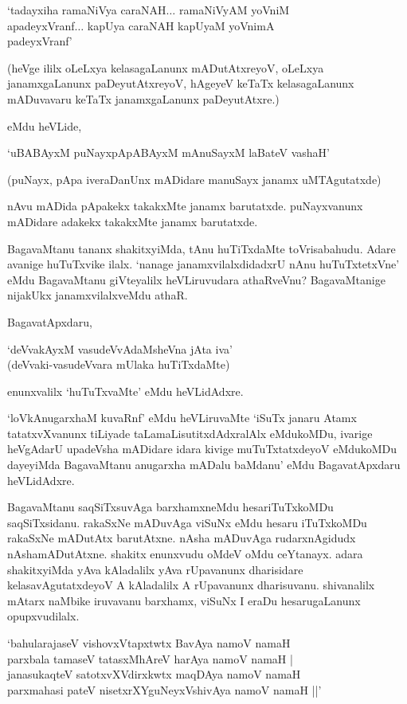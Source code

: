 \begin{shloka}
`tadayxiha ramaNiVya caraNAH$\ldots$ ramaNiVyAM yoVniM\\
apadeyxVranf$\ldots$ kapUya caraNAH kapUyaM yoVnimA\\
padeyxVranf'
\end{shloka}

(heVge ililx oLeLxya kelasagaLanunx mADutAtxreyoV, oLeLxya janamxgaLanunx paDeyutAtxreyoV, hAgeyeV keTaTx kelasagaLanunx mADuvavaru keTaTx janamxgaLanunx paDeyutAtxre.)

eMdu heVLide,

\begin{shloka}
`uBABAyxM puNayxpApABAyxM mAnuSayxM laBateV vashaH'
\end{shloka}

(puNayx, pApa iveraDanUnx mADidare manuSayx janamx uMTAgutatxde)

nAvu mADida pApakekx takakxMte janamx barutatxde. puNayxvanunx mADidare adakekx takakxMte janamx barutatxde.

BagavaMtanu tananx shakitxyiMda, tAnu huTiTxdaMte toVrisabahudu. Adare avanige huTuTxvike ilalx. `nanage janamxvilalxdidadxrU nAnu huTuTxtetxVne' eMdu BagavaMtanu giVteyalilx heVLiruvudara athaRveVnu? BagavaMtanige nijakUkx janamxvilalxveMdu athaR.

BagavatApxdaru,

\begin{shloka}
`deVvakAyxM vasudeVvAdaMsheVna jAta iva'\\
(deVvaki-vasudeVvara mUlaka huTiTxdaMte)
\end{shloka}

enunxvalilx `huTuTxvaMte' eMdu heVLidAdxre.

`loVkAnugarxhaM kuvaRnf' eMdu heVLiruvaMte `iSuTx janaru Atamx tatatxvXvanunx tiLiyade taLamaLisutitxdAdxralAlx eMdukoMDu, ivarige heVgAdarU upadeVsha mADidare idara kivige muTuTxtatxdeyoV eMdukoMDu dayeyiMda BagavaMtanu anugarxha mADalu baMdanu' eMdu BagavatApxdaru heVLidAdxre.


BagavaMtanu saqSiTxsuvAga barxhamxneMdu hesariTuTxkoMDu saqSiTxsidanu. rakaSxNe mADuvAga viSuNx eMdu hesaru iTuTxkoMDu rakaSxNe mADutAtx barutAtxne. nAsha mADuvAga rudarxnAgidudx nAshamADutAtxne. shakitx enunxvudu oMdeV oMdu ceYtanayx. adara shakitxyiMda yAva kAladalilx yAva rUpavanunx dharisidare kelasavAgutatxdeyoV A kAladalilx A rUpavanunx dharisuvanu. shivanalilx mAtarx naMbike iruvavanu barxhamx, viSuNx I eraDu hesarugaLanunx opupxvudilalx.


\begin{shloka}
`bahularajaseV vishovxVtapxtwtx BavAya namoV namaH\\
parxbala tamaseV tatasxMhAreV harAya namoV namaH |\\
janasukaqteV satotxvXVdirxkwtx maqDAya namoV namaH\\
parxmahasi pateV nisetxrXYguNeyxVshivAya namoV namaH ||'
\end{shloka}

